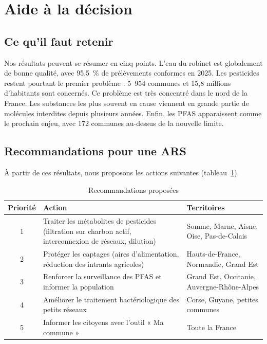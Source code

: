 \documentclass[11pt,a4paper]{article}
\begin{document}
\section{Aide à la décision}

\subsection{Ce qu'il faut retenir}

Nos résultats peuvent se résumer en cinq points. L'eau du robinet est globalement de bonne qualité, avec 95,5~\% de prélèvements conformes en 2025. Les pesticides restent pourtant le premier problème : 5~954 communes et 15,8 millions d'habitants sont concernés. Ce problème est très concentré dans le nord de la France. Les substances les plus souvent en cause viennent en grande partie de molécules interdites depuis plusieurs années. Enfin, les PFAS apparaissent comme le prochain enjeu, avec 172 communes au-dessus de la nouvelle limite.

\subsection{Recommandations pour une ARS}

À partir de ces résultats, nous proposons les actions suivantes (tableau~\ref{tab:reco}).

\begin{table}[H]
\centering
\small
\begin{tabular}{c >{\raggedright}p{7.2cm} >{\raggedright\arraybackslash}p{5.6cm}}
\toprule
Priorité & Action & Territoires \\
\midrule
1 & Traiter les métabolites de pesticides (filtration sur charbon actif, interconnexion de réseaux, dilution) & Somme, Marne, Aisne, Oise, Pas-de-Calais \\
2 & Protéger les captages (aires d'alimentation, réduction des intrants agricoles) & Hauts-de-France, Normandie, Grand Est \\
3 & Renforcer la surveillance des PFAS et informer la population & Grand Est, Occitanie, Auvergne-Rhône-Alpes \\
4 & Améliorer le traitement bactériologique des petits réseaux & Corse, Guyane, petites communes \\
5 & Informer les citoyens avec l'outil « Ma commune » & Toute la France \\
\bottomrule
\end{tabular}
\caption{Recommandations proposées}
\label{tab:reco}
\end{table}
\end{document}

